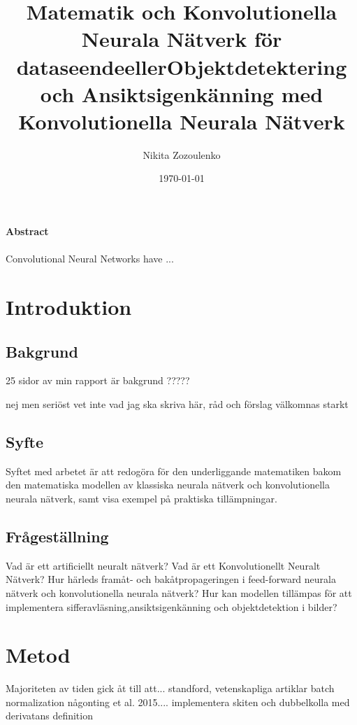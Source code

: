 \documentclass[a4paper,11pt,twoside]{article}
\title{Matematik och Konvolutionella Neurala Nätverk för dataseende}
\title{eller}
\title{Objektdetektering och Ansiktsigenkänning med Konvolutionella Neurala Nätverk}
\author{Nikita Zozoulenko}
\date{\today}
\begin{document}
\begin{titlepage}
\maketitle
\end{titlepage}


\Large{\textbf{Abstract}}\\\\
Convolutional Neural Networks have ...
\newpage

\tableofcontents

\section{Introduktion}

\subsection{Bakgrund}
25 sidor av min rapport är bakgrund ?????

nej men seriöst vet inte  vad jag ska skriva här, råd och förslag välkomnas starkt
\subsection{Syfte}
Syftet med arbetet är att redogöra för den underliggande matematiken bakom den matematiska modellen av klassiska neurala nätverk och konvolutionella neurala nätverk, samt visa exempel på praktiska tillämpningar.
\subsection{Frågeställning}
Vad är ett artificiellt neuralt nätverk?
Vad är ett Konvolutionellt Neuralt Nätverk?
Hur härleds framåt- och bakåtpropageringen i feed-forward neurala nätverk och konvolutionella neurala nätverk?
Hur kan modellen tillämpas för att implementera sifferavläsning,ansiktsigenkänning och objektdetektion i bilder?


\newpage
\section{Metod}

Majoriteten av tiden gick åt till att... standford, vetenskapliga artiklar batch normalization någonting et al. 2015.... implementera skiten och dubbelkolla med derivatans definition

\newpage
\end{document}
